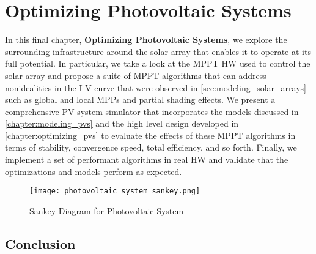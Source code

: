 \chapter{Optimizing Photovoltaic Systems}\label{chapter:optimizing_pv_systems}

In this final chapter, \textbf{Optimizing Photovoltaic Systems}, we explore the
surrounding infrastructure around the solar array that enables it to operate at
its full potential. In particular, we take a look at the \acf{MPPT} \acf{HW}
used to control the solar array and propose a suite of MPPT algorithms that can
address nonidealities in the \ac{I-V} curve that were observed in
\autoref{sec:modeling_solar_arrays} such as global and local \acfp{MPP} and partial
shading effects. We present a comprehensive \ac{PV} system simulator that
incorporates the models discussed in \autoref{chapter:modeling_pvs} and the
high level design developed in \autoref{chapter:optimizing_pvs} to evaluate the
effects of these \ac{MPPT} algorithms in terms of stability, convergence speed,
total efficiency, and so forth. Finally, we implement a set of performant
algorithms in real \ac{HW} and validate that the optimizations and models
perform as expected.


\begin{figure}[h]
    \texttt{[image: photovoltaic\_system\_sankey.png]}
    \caption{Sankey Diagram for Photovoltaic System}
    \label{fig:photovoltaic_system_sankey}
\end{figure}



\section{Conclusion}\label{sec:optimizing_pv_systems_conclusion}


